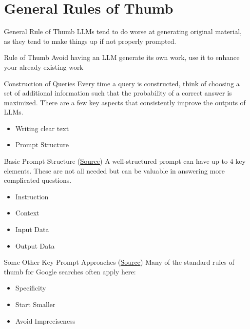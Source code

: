 \documentclass[aspectratio=43]{beamer}
\begin{document}
\section{General Rules of Thumb}
\begin{frame}{General Rule of Thumb}\label{Rule of Thumb}
    LLMs tend to do worse at generating original material, as they tend to make things up if not properly prompted.
    \bigbreak 
    \begin{block}{Rule of Thumb}
        Avoid having an LLM generate its own work, use it to enhance your already existing work
    \end{block}
\end{frame}
\begin{frame}{Construction of Queries}
    Every time a query is constructed, think of choosing a set of additional information such that the probability of a correct answer is maximized. There are a few key aspects that consistently improve the outputs of LLMs. 
    \begin{itemize}
        \item Writing clear text
        \item Prompt Structure
    \end{itemize}
\end{frame}
\begin{frame}{Basic Prompt Structure (\href{https://www.promptingguide.ai/introduction/basics}{Source})}\label{Prompt Structure}
    A well-structured prompt can have up to 4 key elements. These are not all needed but can be valuable in answering more complicated questions. 
    \begin{itemize}
        \item Instruction
        \item Context
        \item Input Data
        \item Output Data
    \end{itemize}
\end{frame}
\begin{frame}{Some Other Key Prompt Approaches (\href{https://www.promptingguide.ai/introduction/basics}{Source})}
    Many of the standard rules of thumb for Google searches often apply here:
    \begin{itemize}
        \item Specificity
        \item Start Smaller
        \item Avoid Impreciseness
    \end{itemize}
\end{frame}
\end{document}
